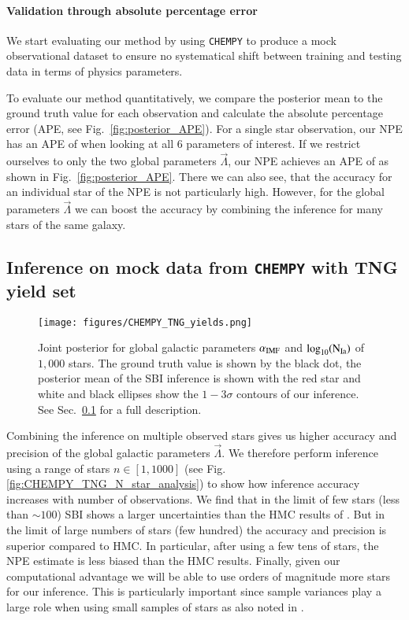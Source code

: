 \documentclass{aa}
\begin{document}
\paragraph{Validation through absolute percentage error}
We start evaluating our method by using \texttt{CHEMPY} to produce a mock observational dataset to ensure no systematical shift between training and testing data in terms of physics parameters.

To evaluate our method quantitatively, we compare the posterior mean to the ground truth value for each observation and calculate the absolute percentage error (APE, see Fig.~\ref{fig:posterior_APE}). For a single star observation, our NPE has an APE of  when looking at all 6 parameters of interest.
If we restrict ourselves to only the two global parameters $\vec\Lambda$, our NPE achieves an APE of  as shown in Fig.~\ref{fig:posterior_APE}. There we can also see, that the accuracy for an individual star of the NPE is not particularly high. However, for the global parameters $\vec\Lambda$ we can boost the accuracy by combining the inference for many stars of the same galaxy.

\subsection{Inference on mock data from \texttt{CHEMPY} with TNG yield set}
\label{subsec:chempy_tng}

\begin{figure}
    \centering
    \texttt{[image: figures/CHEMPY\_TNG\_yields.png]}
    \vspace{-.25cm}
    \caption{Joint posterior for global galactic parameters $\alpha_{\rm IMF}$ and $\log_{10}(\rm N_{Ia})$ of $1,000$ stars. The ground truth value is shown by the black dot, the posterior mean of the SBI inference is shown with the red star and white and black ellipses show the $1-3\sigma$ contours of our inference. See Sec.~\ref{subsec:chempy_tng} for a full description.}
    \label{fig:CHEMPY_TNG_sbi} 
\end{figure}

%
Combining the inference on multiple observed stars gives us higher accuracy and precision of the global galactic parameters $\vec\Lambda$. We therefore perform inference using a range of stars $n\in[1,1000]$ (see Fig. \ref{fig:CHEMPY_TNG_N_star_analysis}) to show how inference accuracy increases with number of observations. We find that in the limit of few stars (less than $\sim100$) SBI shows a larger uncertainties than the HMC results of \citet{Philcox_2019}. But in the limit of large numbers of stars (few hundred) the accuracy and precision is superior compared to HMC. In particular, after using a few tens of stars, the NPE estimate is less biased than the HMC results. 
Finally, given our computational advantage we will be able to use orders of magnitude more stars for our inference.
This is particularly important since sample variances play a large role when using small samples of stars as also noted in \citet{Philcox_2019}.
%
\end{document}
